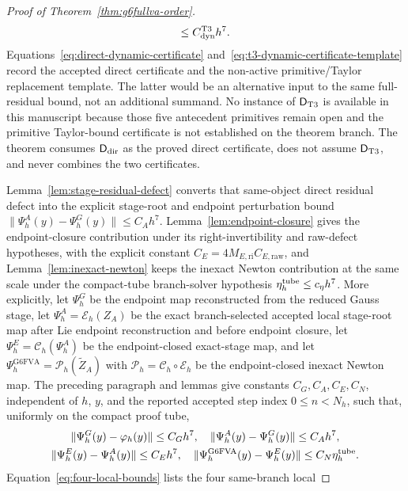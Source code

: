 \documentclass[preprint,12pt]{elsarticle}
\begin{document}
\begin{proof}[Proof of Theorem~\ref{thm:g6fullva-order}]
\begin{equation}
  \le C_{\rm dyn}^{\rm T3}h^7 .
\end{equation}
Equations~\eqref{eq:direct-dynamic-certificate}
and~\eqref{eq:t3-dynamic-certificate-template} record the accepted direct
certificate and the non-active primitive/Taylor replacement template.
The latter would be an alternative input to the same full-residual bound, not
an additional summand.  No instance of \(\mathsf{D}_{\rm T3}\) is available
in this manuscript because those five antecedent primitives remain open and
the primitive Taylor-bound certificate is not established on the theorem
branch.  The theorem consumes
\(\mathsf{D}_{\rm dir}\) as the proved direct certificate, does not assume
\(\mathsf{D}_{\rm T3}\), and never combines the two certificates.

Lemma~\ref{lem:stage-residual-defect} converts that same-object direct residual defect
into the explicit stage-root and endpoint perturbation bound
\(\|\Psi_h^A(y)-\Psi_h^G(y)\|\le C_Ah^7\).
Lemma~\ref{lem:endpoint-closure} gives the endpoint-closure contribution under
its right-invertibility and raw-defect hypotheses, with the explicit constant
\(C_E=4M_{E,\mathrm{ri}}C_{E,\mathrm{raw}}\), and
Lemma~\ref{lem:inexact-newton} keeps the inexact Newton contribution at the
same scale under the compact-tube branch-solver hypothesis
\(\eta_h^{\rm tube}\le c_\eta h^7\).
More explicitly, let $\Psi_h^G$ be the endpoint map reconstructed from the
reduced Gauss stage, let
\(\Psi_h^A=\mathcal E_h(Z_A)\) be the exact branch-selected accepted
local stage-root map after Lie endpoint reconstruction and before endpoint
closure, let \(\Psi_h^E=\mathcal C_h(\Psi_h^A)\) be the endpoint-closed
exact-stage map, and let
\(\Psi_h^{\mathrm{G6FVA}}=\mathcal P_h(\widetilde Z_A)\) with
\(\mathcal P_h=\mathcal C_h\circ\mathcal E_h\) be the endpoint-closed inexact
Newton map. The
preceding paragraph and lemmas give constants \(C_G,C_A,C_E,C_N\),
independent of \(h\), \(y\), and the reported accepted step index
\(0\le n<N_h\), such that,
uniformly on the
compact proof tube,
\begin{equation}
\label{eq:four-local-bounds}
\begin{gathered}
  \|\Psi_h^G(y)-\varphi_h(y)\|\le C_G h^7,\quad
  \|\Psi_h^A(y)-\Psi_h^G(y)\|\le C_A h^7,
\\
  \|\Psi_h^E(y)-\Psi_h^A(y)\|\le C_E h^7,\quad
  \|\Psi_h^{\mathrm{G6FVA}}(y)-\Psi_h^E(y)\|\le C_N\eta_h^{\rm tube}.
\end{gathered}
\end{equation}
Equation~\eqref{eq:four-local-bounds} lists the four same-branch local

\end{proof}
\end{document}
